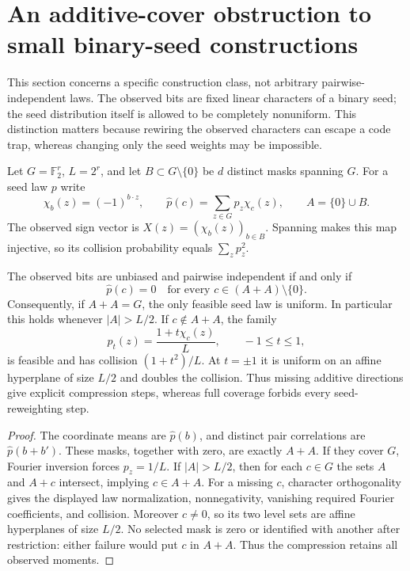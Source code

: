 \section{An additive-cover obstruction to small binary-seed constructions}
\label{s14:sec:character-rigidity}
This section concerns a specific construction class, not arbitrary
pairwise-independent laws. The observed bits are fixed linear
characters of a binary seed; the seed distribution itself is allowed
to be completely nonuniform. This distinction matters because
rewiring the observed characters can escape a code trap, whereas
changing only the seed weights may be impossible.

Let $G=\mathbb F_2^r$, $L=2^r$, and let
$B\subset G\setminus\{0\}$ be $d$ distinct masks spanning $G$.
For a seed law $p$ write
\[
 \chi_b(z)=(-1)^{b\cdot z},\qquad
 \widehat p(c)=\sum_{z\in G}p_z\chi_c(z),\qquad
 A=\{0\}\cup B.
\]
The observed sign vector is $X(z)=(\chi_b(z))_{b\in B}$.
Spanning makes this map injective, so its collision probability equals
$\sum_zp_z^2$.

\begin{theorem}
\label{s14:thm:character-cover}
The observed bits are unbiased and pairwise independent if and only if
\[
 \widehat p(c)=0\quad\text{for every }c\in(A+A)\setminus\{0\}.
\]
Consequently, if $A+A=G$, the only feasible seed law is uniform.
In particular this holds whenever $|A|>L/2$.
If $c\notin A+A$, the family
\[
 p_t(z)=\frac{1+t\chi_c(z)}L,\qquad -1\le t\le1,
\]
is feasible and has collision $(1+t^2)/L$. At $t=\pm1$ it is uniform
on an affine hyperplane of size $L/2$ and doubles the collision.
Thus missing additive directions give explicit compression steps,
whereas full coverage forbids every seed-reweighting step.
\end{theorem}
\begin{proof}
The coordinate means are $\widehat p(b)$, and distinct pair
correlations are $\widehat p(b+b')$. These masks, together with zero,
are exactly $A+A$. If they cover $G$, Fourier inversion forces
$p_z=1/L$. If $|A|>L/2$, then for each $c\in G$ the sets
$A$ and $A+c$ intersect, implying $c\in A+A$.
For a missing $c$, character orthogonality gives the displayed law
normalization, nonnegativity, vanishing required Fourier coefficients,
and collision. Moreover $c\ne0$, so its two level sets are affine
hyperplanes of size $L/2$. No selected mask is zero or identified
with another after restriction: either failure would put $c$ in
$A+A$. Thus the compression retains all observed moments.
\end{proof}

